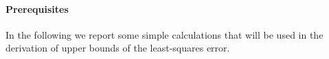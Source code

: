 \documentclass[../main.tex]{subfiles}
\begin{document}
\paragraph{Prerequisites}\label{par:prereq}
In the following we report some simple calculations that will be used in the derivation of upper bounds of the least-squares error.


\end{document}
